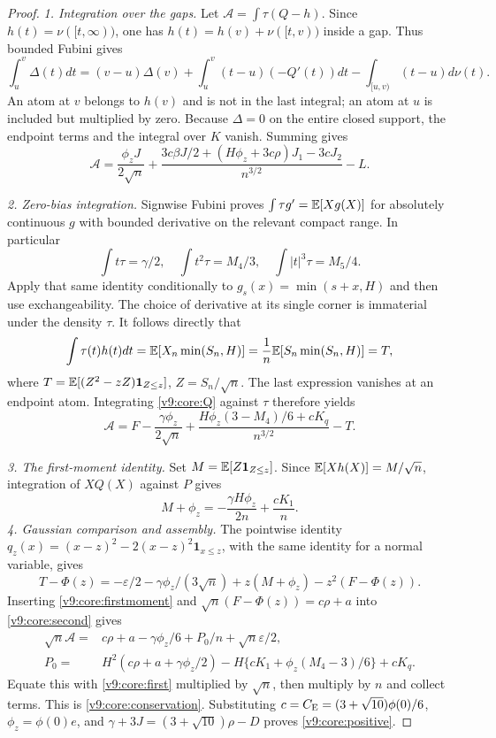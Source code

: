 \begin{proof}
\emph{1. Integration over the gaps.}
Let $\mathcal A=\int\tau(Q-h)$. Since $h(t)=\nu([t,\infty))$, one has
$h(t)=h(v)+\nu([t,v))$ inside a gap. Thus bounded Fubini gives
\[
 \int_u^v\Delta(t)dt=(v-u)\Delta(v)
 +\int_u^v(t-u)(-Q'(t))dt
 -\int_{[u,v)}(t-u)d\nu(t).
\]
An atom at $v$ belongs to $h(v)$ and is not in the last integral;
an atom at $u$ is included but multiplied by zero. Because $\Delta=0$ on the entire closed support, the endpoint terms
and the integral over $K$ vanish. Summing gives
\begin{equation}\label{v9:core:first}
 \mathcal A=\frac{\phi_z J}{2\sqrt n}
 +\frac{3c\beta J/2+(H\phi_z+3c\rho)J_1-3cJ_2}{n^{3/2}}-L.
\end{equation}

\emph{2. Zero-bias integration.} Signwise Fubini proves
$\int\tau g'=\mathbb E[Xg(X)]$ for absolutely continuous $g$ with bounded
derivative on the relevant compact range. In particular
\[
 \int t\tau=\gamma/2,\quad \int t^2\tau=M_4/3,
 \quad\int |t|^3\tau=M_5/4.
\]
Apply that same identity conditionally to
$g_s(x)=\min(s+x,H)$ and then use exchangeability. The choice of
derivative at its single corner is immaterial under the density $\tau$.
It follows directly that
\[
 \int\tau(t)h(t)dt=\mathbb E[X_n\min(S_n,H)]
 =\frac1n\mathbb E[S_n\min(S_n,H)]
 =T,
\]
where $T=\mathbb E[(Z^2-zZ)\mathbf1_{Z\le z}]$, $Z=S_n/\sqrt n$.
The last expression vanishes at an endpoint atom. Integrating
\eqref{v9:core:Q} against $\tau$ therefore yields
\begin{equation}\label{v9:core:second}
 \mathcal A=F-\frac{\gamma\phi_z}{2\sqrt n}
 +\frac{H\phi_z(3-M_4)/6+cK_q}{n^{3/2}}-T.
\end{equation}

\emph{3. The first-moment identity.} Set $M=\mathbb E[Z\mathbf1_{Z\le z}]$. Since
$\mathbb E[Xh(X)]=M/\sqrt n$, integration of $XQ(X)$ against $P$ gives
\begin{equation}\label{v9:core:firstmoment}
 M+\phi_z=-\frac{\gamma H\phi_z}{2n}+\frac{cK_1}{n}.
\end{equation}
\emph{4. Gaussian comparison and assembly.} The pointwise identity
$q_z(x)=(x-z)^2-2(x-z)^2\mathbf1_{x\le z}$, with the same identity
for a normal variable, gives
\[
 T-\Phi(z)=-\varepsilon/2-\gamma\phi_z/(3\sqrt n)
              +z(M+\phi_z)-z^2(F-\Phi(z)).
\]
Inserting \eqref{v9:core:firstmoment} and
$\sqrt n(F-\Phi(z))=c\rho+a$ into \eqref{v9:core:second} gives
\begin{align*}
 \sqrt n\mathcal A={}&c\rho+a-\gamma\phi_z/6+P_0/n
                    +\sqrt n\varepsilon/2,\\
 P_0={}&H^2(c\rho+a+\gamma\phi_z/2)
       -H\{cK_1+\phi_z(M_4-3)/6\}+cK_q.
\end{align*}
Equate this with \eqref{v9:core:first} multiplied by $\sqrt n$,
then multiply by $n$ and collect terms. This is
\eqref{v9:core:conservation}. Substituting
$c=C_{\mathrm E}=(3+\sqrt{10})\phi(0)/6$, $\phi_z=\phi(0)e$, and
$\gamma+3J=(3+\sqrt{10})\rho-D$ proves
\eqref{v9:core:positive}.
\end{proof}


